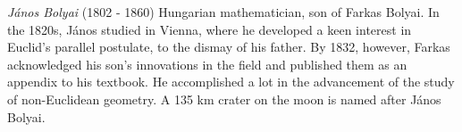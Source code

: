 \documentclass[12pt]{article}
\begin{document}
\emph{J\'anos Bolyai} (1802 - 1860) Hungarian mathematician, son of Farkas Bolyai. In the 1820s, J\'anos studied in Vienna, where he developed a keen interest in Euclid's parallel postulate, to the dismay of his father. By 1832, however, Farkas acknowledged his son's innovations in the field and published them as an appendix to his textbook. He accomplished a lot in the advancement of the study of non-Euclidean geometry. A 135 km crater on the moon is named after J\'anos Bolyai.
\end{document}
